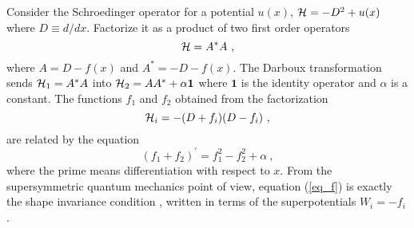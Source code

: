 \documentclass[a4paper,11pt]{article}
\begin{document}
Consider the Schroedinger operator for a potential $u(x)$, ${\cal H }=-D^2+u(x)$
where $D\equiv d/dx$. Factorize it as a product of two first order operators
\begin{equation}
\label{Sr}
{\cal H}=A^{*}A ~,
\end{equation}
where $A=D-f(x)$ and $A^{*}=-D-f(x).$
The Darboux transformation sends ${\cal H}_1=A^{*}A$ into ${\cal H}_2=AA^{*}+\alpha \mathbf{1}$
where $\mathbf{1}$ is the identity operator and $\alpha $ is a constant. The functions $f_1$ and
$f_2$ obtained from the factorization
\begin{equation}
\label{fac}
{\cal H}_i=-(D+f_i)(D-f_i) ~,
\end{equation}
are related by the equation
\begin{equation}
\label{eq_f}
(f_1+f_2)^{'}=f_1^2-f_2^2+\alpha ~,
\end{equation}
where the prime means differentiation with respect to $x$.
From the supersymmetric quantum mechanics point of view, equation
(\ref{eq_f}) is exactly the shape invariance condition \cite{Cooper},
written in terms of the superpotentials $W_i=-f_i$ .
\end{document}
